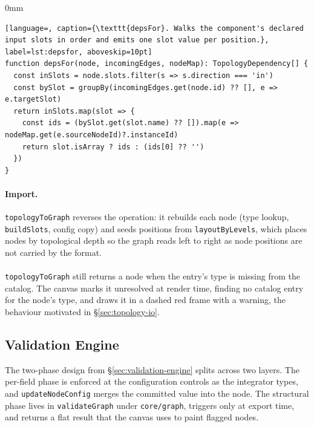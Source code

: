 \begin{addmargin}[0mm]{0mm}
\begin{lstlisting}[language=, caption={\texttt{depsFor}. Walks the component's declared input slots in order and emits one slot value per position.}, label=lst:depsfor, aboveskip=10pt]
function depsFor(node, incomingEdges, nodeMap): TopologyDependency[] {
  const inSlots = node.slots.filter(s => s.direction === 'in')
  const bySlot = groupBy(incomingEdges.get(node.id) ?? [], e => e.targetSlot)
  return inSlots.map(slot => {
    const ids = (bySlot.get(slot.name) ?? []).map(e => nodeMap.get(e.sourceNodeId)?.instanceId)
    return slot.isArray ? ids : (ids[0] ?? '')
  })
}
\end{lstlisting}
\end{addmargin}

\paragraph{Import.}
\texttt{topologyToGraph} reverses the operation: it rebuilds each node (type lookup, \texttt{buildSlots}, config copy) and seeds positions from \texttt{layoutByLevels}, which places nodes by topological depth so the graph reads left to right as node positions are not carried by the format.

\paragraph{}
\texttt{topologyToGraph} still returns a node when the entry's type is missing from the catalog. The canvas marks it unresolved at render time, finding no catalog entry for the node's type, and draws it in a dashed red frame with a warning, the behaviour motivated in \S\ref{sec:topology-io}.

\FloatBarrier

\subsection{Validation Engine}
\label{sec:validation-impl}

The two-phase design from \S\ref{sec:validation-engine} splits across two layers. The per-field phase is enforced at the configuration controls as the integrator types, and \texttt{updateNodeConfig} merges the committed value into the node. The structural phase lives in \texttt{validateGraph} under \texttt{core/graph}, triggers only at export time, and returns a flat result that the canvas uses to paint flagged nodes.

